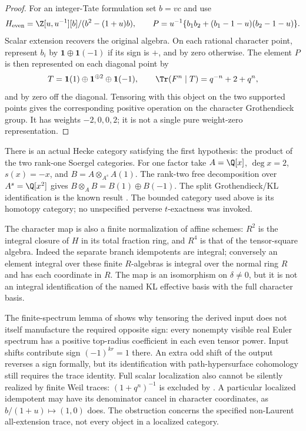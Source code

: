 \begin{proof}
For an integer-Tate formulation set $b=vc$ and use
\[
 H_{\rm even}=\Z[u,u^{-1}][b]/(b^2-(1+u)b),\qquad
 P=u^{-1}\{b_1b_2+(b_1-1-u)(b_2-1-u)\}.
\]
Scalar extension recovers the original algebra. On each rational
character point, represent $b_i$ by $\mathbf1\oplus\mathbf1(-1)$
if its sign is $+$, and by zero otherwise. The element $P$ is then
represented on each diagonal point by
\[
 T=\mathbf1(1)\oplus\mathbf1^{\oplus2}\oplus\mathbf1(-1),
 \qquad \Tr(F^n\mid T)=q^{-n}+2+q^n,
\]
and by zero off the diagonal. Tensoring with this object on the
two supported points gives the corresponding positive operation on
the character Grothendieck group. It has weights $-2,0,0,2$;
it is not a single pure weight-zero representation.
\end{proof}

There is an actual Hecke category satisfying the first hypothesis:
the product of the two rank-one Soergel categories. For one factor
take $A=\Q[x]$, $\deg x=2$, $s(x)=-x$, and
$B=A\otimes_{A^s}A(1)$. The rank-two free decomposition over
$A^s=\Q[x^2]$ gives $B\otimes_A B=B(1)\oplus B(-1)$.
The split Grothendieck/KL identification is the known result
\cite[\S3.5, Theorem~3.5, pp.~1107--1108; Theorem~1.1, p.~1093]{EW}.
The bounded category used above is its homotopy category; no
unspecified perverse $t$-exactness was invoked.

The character map is also a finite normalization of affine schemes:
$R^2$ is the integral closure of $H$ in its total fraction ring,
and $R^4$ is that of the tensor-square algebra. Indeed the separate
branch idempotents are integral; conversely an element integral over
these finite $R$-algebras is integral over the normal ring $R$ and
has each coordinate in $R$. The map is an isomorphism on
$\delta\ne0$, but it is not an integral identification of the named
KL effective basis with the full character basis.

The finite-spectrum lemma of  shows why tensoring the
derived input does not itself manufacture the required opposite sign:
every nonempty visible real Euler spectrum has a positive top-radius
coefficient in each even tensor power. Input shifts contribute sign
$(-1)^{kr}=1$ there. An extra odd shift of the output reverses a sign
formally, but its identification with path-hypersurface cohomology
still requires the trace identity. Full scalar localization also
cannot be silently realized by finite Weil traces:
$(1+q^n)^{-1}$ is excluded by . A particular localized
idempotent may have its denominator cancel in character coordinates,
as $b/(1+u)\mapsto(1,0)$ does. The obstruction concerns the specified
non-Laurent all-extension trace, not every object in a localized
category.


